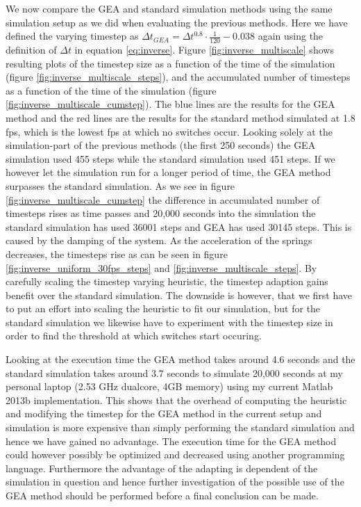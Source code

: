 \documentclass[11pt]{article}
\begin{document}
We now compare the GEA and standard simulation methods using the same simulation
setup as we did when evaluating the previous methods. Here we have defined the varying
timestep as $\Delta t_{GEA} = \Delta t^{0.8} \cdot \frac{1}{120}-0.038$ again
using the definition of $\Delta t$ in equation \ref{eq:inverse}.
Figure \ref{fig:inverse_multiscale} shows resulting plots of the timestep size
as a function of the time of the simulation (figure
\ref{fig:inverse_multiscale_steps}), and the accumulated number of timesteps as a
function of the time of the simulation (figure
\ref{fig:inverse_multiscale_cumstep}). The blue lines are the results for the GEA
method and the red lines are the results for the standard method simulated at
1.8 fps, which is the lowest fps at which no switches occur.
Looking solely at the simulation-part of the previous methods (the first 250
seconds) the GEA simulation used 455 steps while the standard simulation used 451 steps.
If we however let the
simulation run for a longer period of time, the GEA method surpasses the
standard simulation. As we see in figure \ref{fig:inverse_multiscale_cumstep} the
difference in accumulated number of timesteps rises as time passes and 20,000
seconds into the simulation the standard simulation has used 36001 steps and GEA
has used 30145 steps.
This is caused by the damping of
the system. As the acceleration of the springs decreases, the timesteps rise as can
be seen in figure \ref{fig:inverse_uniform_30fps_steps} and
\ref{fig:inverse_multiscale_steps}. By carefully scaling the
timestep varying heuristic, the timestep adaption gains benefit over the
standard simulation. The downside is however, that we first have to put an
effort into scaling the heuristic to fit our simulation, but for the standard
simulation we likewise have to experiment with the timestep size in order to
find the threshold at which switches start occuring.

Looking at the execution time the GEA method takes around 4.6 seconds and the
standard simulation takes around 3.7 seconds to simulate 20,000 seconds at my
personal laptop (2.53 GHz dualcore, 4GB memory) using my current Matlab 2013b
implementation. This shows that the overhead of computing the heuristic and
modifying the timestep for the GEA method in the current setup and simulation
is more expensive than simply performing the standard simulation and hence we
have gained no advantage. The execution time for the GEA method could however
possibly be optimized and decreased using another programming language.
Furthermore the advantage of the adapting is dependent of the simulation in
question and hence further investigation of the possible use of the GEA method
should be performed before a final conclusion can be made.
\end{document}
